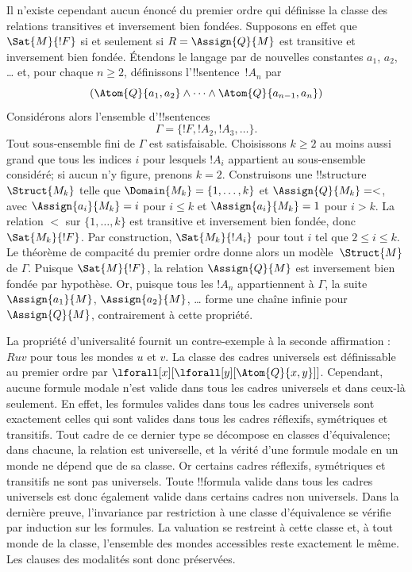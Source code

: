 \documentclass[../../../include/open-logic-section]{subfiles}
\begin{document}
Il n'existe cependant aucun énoncé du premier ordre qui définisse
la classe des relations transitives et inversement bien fondées.
Supposons en effet que~$\Sat{M}{!F}$ si et seulement si
$R = \Assign{Q}{M}$ est transitive et inversement bien fondée.
Étendons le langage par de nouvelles constantes
$a_1$, $a_2$, \dots{} et, pour chaque $n \ge 2$,
définissons l'!!{sentence}~$!A_n$ par
\[
(\Atom{Q}{a_1,a_2} \land \dots \land
    \Atom{Q}{a_{n-1},a_{n}})
\]
Considérons alors l'ensemble d'!!{sentence}s
\[
\Gamma = \{!F, !A_2, !A_3, \dots\}.
\]
Tout sous-ensemble fini de $\Gamma$ est satisfaisable.
Choisissons $k \ge 2$ au moins aussi grand que tous les indices
$i$ pour lesquels $!A_i$ appartient au sous-ensemble considéré;
si aucun n'y figure, prenons $k = 2$. Construisons une
!!{structure}~$\Struct{M_k}$ telle que
$\Domain{M_k} = \{1, \dots, k\}$ et
$\Assign{Q}{M_k} = <$, avec
$\Assign{a_i}{M_k} = i$ pour $i \le k$ et
$\Assign{a_i}{M_k} = 1$ pour $i > k$.
La relation $<$ sur $\{1, \dots, k\}$ est transitive et
inversement bien fondée, donc $\Sat{M_k}{!F}$.
Par construction, $\Sat{M_k}{!A_i}$ pour tout $i$ tel que
$2 \le i \le k$.
Le théorème de compacité du premier ordre donne alors un
modèle~$\Struct{M}$ de $\Gamma$. Puisque
$\Sat{M}{!F}$, la relation $\Assign{Q}{M}$ est
inversement bien fondée par hypothèse. Or, puisque
tous les $!A_n$ appartiennent à $\Gamma$, la suite
$\Assign{a_1}{M}$, $\Assign{a_2}{M}$, \dots{}
forme une chaîne infinie pour $\Assign{Q}{M}$,
contrairement à cette propriété.

La propriété d'universalité fournit un contre-exemple à la
seconde affirmation : $Ruv$ pour tous les mondes $u$ et $v$.
La classe des cadres universels est définissable au premier
ordre par $\lforall[x][\lforall[y][\Atom{Q}{x,y}]]$.
Cependant, aucune formule modale n'est valide dans tous les
cadres universels et dans ceux-là seulement. En effet, les
formules valides dans tous les cadres universels sont
exactement celles qui sont valides dans tous les cadres
réflexifs, symétriques et transitifs. Tout cadre de ce
dernier type se décompose en classes d'équivalence; dans
chacune, la relation est universelle, et la vérité d'une
formule modale en un monde ne dépend que de sa classe.
Or certains cadres réflexifs, symétriques et transitifs ne
sont pas universels. Toute !!{formula} valide dans tous
les cadres universels est donc également valide dans
certains cadres non universels.
Dans la dernière preuve, l'invariance par restriction à une
classe d'équivalence se vérifie par induction sur les formules.
La valuation se restreint à cette classe et, à tout monde de
la classe, l'ensemble des mondes accessibles reste exactement
le même. Les clauses des modalités sont donc préservées.
\end{document}
